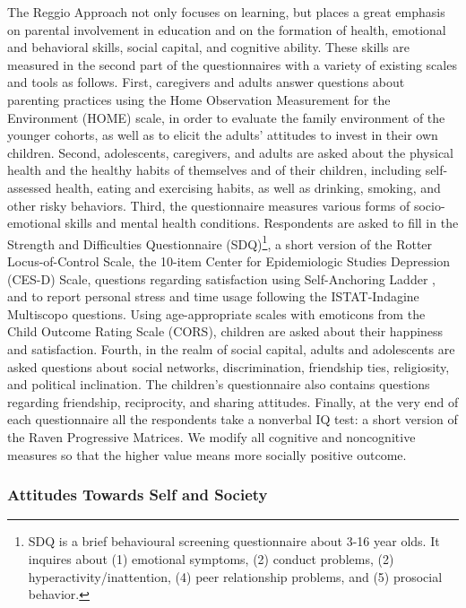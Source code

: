 The Reggio Approach not only focuses on
learning, but places a great emphasis on parental involvement in education
and on the formation of health, emotional and behavioral skills, social
capital, and cognitive ability. These skills are measured in the second part
of the questionnaires with a variety of existing scales and tools as follows. First, caregivers and adults answer questions about
parenting practices using the Home Observation Measurement for the
Environment (HOME) scale, in order to evaluate the family environment of the
younger cohorts, as well as to elicit the adults' attitudes to invest in
their own children. Second, adolescents, caregivers, and adults are asked
about the physical health and the healthy habits of themselves and of their
children, including self-assessed health, eating and exercising habits, as well as drinking, smoking, and other risky
behaviors. Third, the questionnaire measures various forms of
socio-emotional skills and mental health conditions. Respondents are asked
to fill in the Strength and Difficulties Questionnaire (SDQ)\footnote{SDQ is a brief behavioural screening questionnaire about 3-16 year olds. It inquires about (1) emotional symptoms, (2) conduct problems, (2) hyperactivity/inattention, (4) peer relationship problems, and (5) prosocial behavior.}, a short
version of the Rotter Locus-of-Control Scale, the 10-item Center for
Epidemiologic Studies Depression (CES-D) Scale, questions regarding
satisfaction using Self-Anchoring Ladder \citep{Cantril_1965_BOOK_Pattern-Hum-Con}, and to report
personal stress and time usage following the ISTAT-Indagine Multiscopo
questions. Using age-appropriate scales with emoticons from the Child
Outcome Rating Scale (CORS), children are asked about their happiness and
satisfaction. Fourth, in the realm of social capital, adults and adolescents
are asked questions about social networks, discrimination, friendship ties,
religiosity, and political inclination. The children's questionnaire also
contains questions regarding friendship, reciprocity, and sharing attitudes.
Finally, at the very end of each questionnaire all the respondents take a
nonverbal IQ test: a short version of the Raven
Progressive Matrices. We modify all cognitive and noncognitive measures so that the higher value means more socially positive outcome.

\subsubsection{Attitudes Towards Self and Society}

